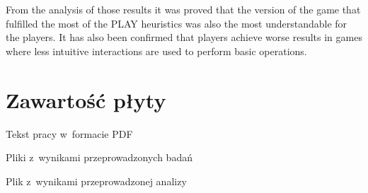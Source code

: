 \documentclass[a4paper,12pt,numbers=noenddot]{report}
\begin{document}
From the analysis of those results it was proved that the version of the game that fulfilled the most of the PLAY heuristics was also the most understandable for the players. It has also been confirmed that players achieve worse results in games where less intuitive interactions are used to perform basic operations.

 
%

\renewcommand{\listoffigures}{\begingroup
\tocchapter
{}
\endgroup}
\listoffigures
\chapter{Zawartość płyty}
\begin{enumerate}[label={[\arabic*]}]
  \item Tekst pracy w~formacie PDF
  \item Pliki z~wynikami przeprowadzonych badań
  \item Plik z~wynikami przeprowadzonej analizy
\end{enumerate}
\end{document}
